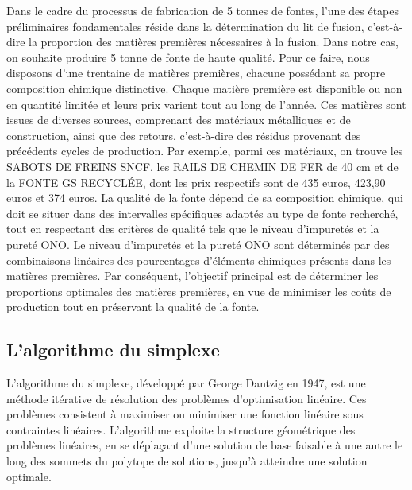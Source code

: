 \documentclass[12pt]{article}
\begin{document}
Dans le cadre du processus de fabrication de 5 tonnes de fontes, l'une des étapes préliminaires fondamentales
réside dans la détermination du lit de fusion, c'est-à-dire la proportion des matières premières
nécessaires à la fusion. Dans notre cas, on souhaite  produire 5 tonne de fonte de haute qualité.
Pour ce faire, nous disposons d'une trentaine de matières premières, chacune possédant sa propre
composition chimique distinctive. Chaque matière première est disponible ou non en quantité limitée
et leurs prix varient tout au long de l'année. Ces matières sont issues de diverses sources,
comprenant des matériaux métalliques et de construction, ainsi que des retours, c'est-à-dire
des résidus provenant des précédents cycles de production. Par exemple, parmi ces matériaux,
on trouve les SABOTS DE FREINS SNCF, les RAILS DE CHEMIN DE FER de 40 cm et de la FONTE GS RECYCLÉE,
dont les prix respectifs sont de 435 euros, 423,90 euros et 374 euros. La qualité de la fonte dépend
de sa composition chimique, qui doit se situer dans des intervalles spécifiques adaptés au type
de fonte recherché, tout en respectant des critères de qualité tels que le niveau d'impuretés et
la pureté ONO. Le niveau d'impuretés et la pureté ONO sont déterminés par des combinaisons linéaires
des pourcentages d'éléments chimiques présents dans les matières premières. Par conséquent,
l'objectif principal est de déterminer les proportions optimales des matières premières,
en vue de minimiser les coûts de production tout en préservant la qualité de la fonte.







\subsection{ L'algorithme du simplexe }


L'algorithme du simplexe, développé par George Dantzig en 1947, est une 
méthode itérative de résolution des problèmes d'optimisation linéaire. 
Ces problèmes consistent à maximiser ou minimiser une fonction linéaire 
sous contraintes linéaires. L'algorithme exploite la structure géométrique 
des problèmes linéaires, en se déplaçant d'une solution de base faisable 
à une autre le long des sommets du polytope de solutions, jusqu'à 
atteindre une solution optimale.




\end{document}
